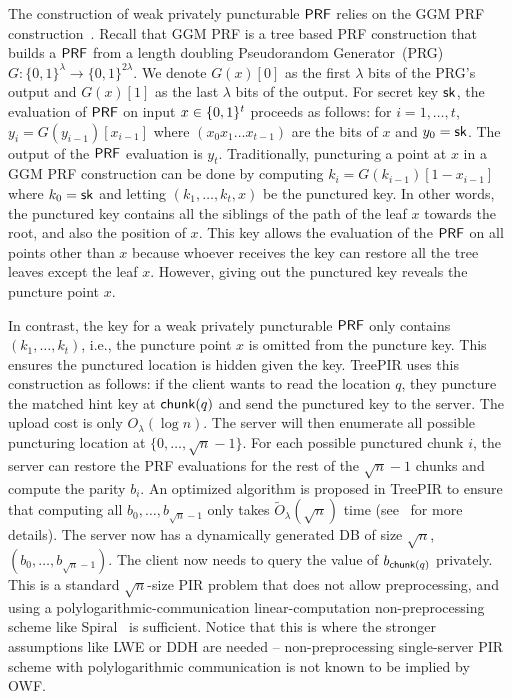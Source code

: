 The construction of weak privately puncturable $\mathsf{PRF}$ relies on the GGM PRF construction~\cite{GGM86}. Recall that  GGM PRF is a tree based PRF construction that builds a $\mathsf{PRF}$ from a length doubling Pseudorandom Generator~(PRG) $G:\{0,1\}^\lambda\to\{0,1\}^{2\lambda}$.
We denote $G(x)[0]$ as the first $\lambda$ bits of the PRG's output and $G(x)[1]$ as the last $\lambda$ bits of the output.
For secret key $\mathsf{sk}$, the  evaluation of $\mathsf{PRF}$ on input $x\in \{0,1\}^t$ proceeds as follows: for $i=1,\ldots,t$, $y_i=G(y_{i-1})[x_{i-1}]$ where $(x_0x_1\ldots x_{t-1})$ are the bits of $x$ and $y_0=\mathsf{sk}$. The output of the $\mathsf{PRF}$ evaluation is $y_t$.
Traditionally, puncturing a point at $x$ in a GGM PRF construction can be done by computing $k_i=G(k_{i-1})[1-x_{i-1}]$ where $k_0=\mathsf{sk}$ and letting $(k_1,\dots,k_{t}, x)$ be the punctured key.
In other words, the punctured key contains all the siblings of the path of the leaf $x$ towards the root, and also the position of $x$. This key allows the evaluation of the $\mathsf{PRF}$ on all points other than $x$ because whoever receives the key can restore all the tree leaves except the leaf $x$.
However, giving out the punctured key reveals the puncture point $x$. 


In contrast, the key for a weak privately puncturable $\mathsf{PRF}$ only contains $(k_1,\ldots,k_t)$, i.e., the puncture point $x$ is omitted from the puncture key. This ensures the punctured location is hidden given the key. %
TreePIR uses this construction as follows: if the client wants to read the location $q$, they puncture the matched hint key at $\mathsf{chunk}(q)$ and send the punctured key to the server.
The upload cost is only $O_\lambda(\log n)$.
The server will then enumerate all possible puncturing location at $\{0,\ldots,\sqrt{n}-1\}$.
For each possible punctured chunk $i$, the server can restore the PRF evaluations for the rest of the $\sqrt{n}-1$ chunks and compute the parity $b_i$.
An optimized algorithm is proposed in TreePIR to ensure that computing all $b_0,\dots,b_{\sqrt{n}-1}$ only takes $\widetilde{O}_\lambda(\sqrt{n})$ time (see~\cite{treepir} for more details).
The server now has a dynamically generated DB of size $\sqrt{n}$, $(b_0,\dots,b_{\sqrt{n}-1})$.
The client now needs to query the value of $b_{\mathsf{chunk}(q)}$ privately.
This is a standard $\sqrt{n}$-size PIR problem that does not allow preprocessing, and using a polylogarithmic-communication linear-computation non-preprocessing scheme like Spiral~\cite{spiral} is sufficient.
Notice that this is where the stronger assumptions like LWE or DDH are needed -- non-preprocessing single-server PIR scheme with polylogarithmic communication is not known to be implied by OWF.



